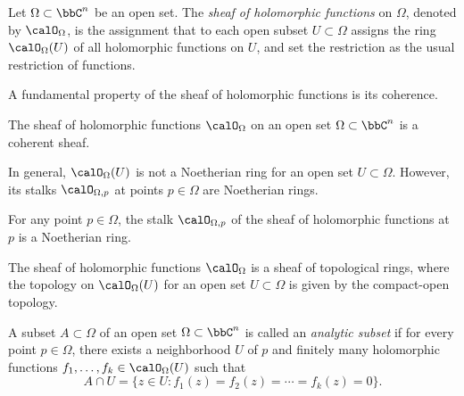
    \begin{definition}\label{def:sheaf_of_holomorphic_functions}
        Let \(\Omega \subset \bbC^n\) be an open set. 
        The \emph{sheaf of holomorphic functions} on \(\Omega\), denoted by \(\calO_\Omega\), 
        is the assignment that to each open subset \(U \subset \Omega\) assigns the ring \(\calO_\Omega(U)\) of all holomorphic functions on \(U\), 
        and set the restriction as the usual restriction of functions.
    \end{definition}

    A fundamental property of the sheaf of holomorphic functions is its coherence.

    \begin{theorem}\label{thm:Oka_Coherence_Theorem}
        The sheaf of holomorphic functions \(\calO_\Omega\) on an open set \(\Omega \subset \bbC^n\) is a coherent sheaf.
    \end{theorem}

    In general, \(\calO_\Omega(U)\) is not a Noetherian ring for an open set \(U \subset \Omega\).
    However, its stalks \(\calO_{\Omega, p}\) at points \(p \in \Omega\) are Noetherian rings.

    \begin{example}\label{eg:ring_of_holomorphic_functions_is_not_Noetherian}
    \end{example}

    \begin{proposition}\label{prop:stalk_of_sheaf_of_holomorphic_functions_is_local_noetherian_regular}
        For any point \(p \in \Omega\), the stalk \(\calO_{\Omega, p}\) of the sheaf of holomorphic functions at \(p\) is a Noetherian ring.
    \end{proposition}

    \begin{remark}\label{rmk:topological_properties_stalk_of_sheaf_of_holomorphic_functions}
        The sheaf of holomorphic functions \(\calO_\Omega\) is a sheaf of topological rings, where the topology on \(\calO_\Omega(U)\) for an open set \(U \subset \Omega\) is given by the compact-open topology.
    \end{remark}

    \begin{definition}\label{def:analytic_subset}
        A subset \(A \subset \Omega\) of an open set \(\Omega \subset \bbC^n\) is called an \emph{analytic subset} if for every point \(p \in \Omega\), there exists a neighborhood \(U\) of \(p\) and finitely many holomorphic functions \(f_1, \ldots, f_k \in \calO_\Omega(U)\) such that 
        \[ A \cap U = \{ z \in U : f_1(z) = f_2(z) = \cdots = f_k(z) = 0 \}. \]
    \end{definition}